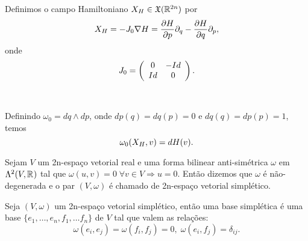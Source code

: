 \documentclass{beamer}
\begin{document}
	
	\begin{frame}
		
		Definimos o campo Hamiltoniano $X_{H} \in \mathfrak{X}(\mathbb{R}^{2n})$ por 
		$$
		X_{H} = -J_{0} \nabla H =  \frac{\partial H}{\partial p}\partial_{q} - \frac{\partial H}{\partial q}\partial_{p}, 
		$$
		onde
		$$
		J_{0}=
		\left(
		\begin{array}{cc}
		0 & -Id
		\\
		Id & 0
		\end{array}
		\right). 
		$$
		\\~\\
		Definindo $\omega_{0}= dq \wedge dp$, onde $dp(q) = dq(p) = 0$ e $dq(q) = dp(p) = 1$, temos
		$$
		\omega_{0}(X_{H}, v) = dH(v).
		$$
	\end{frame}
		
	\begin{frame}
		\begin{definicao}
			Sejam $V$ um 2n-espaço vetorial real e uma forma bilinear anti-simétrica $\omega$ em $\Lambda^{2}(V, \mathbb{R}^{})$ tal que $\omega(u,v) = 0 \; \forall v \in V \Rightarrow u=0$. Então dizemos que $\omega$ é não-degenerada e o par $(V, \omega)$ é chamado de 2n-espaço vetorial simplético.
		\end{definicao}
		\begin{definicao}
			Seja $(V, \omega)$ um 2n-espaço vetorial simplético, então uma base simplética é uma base $\{ e_{1},\dots, e_{n},f_{1},\dots f_{n}\}$ de $V$ tal que valem as relações:
			$$
			\omega(e_{i}, e_{j}) = \omega(f_{i}, f_{j}) = 0, \; \omega(e_{i}, f_{j}) = \delta_{ij}.
			$$
		\end{definicao}
		
	\end{frame}
	
\end{document}
